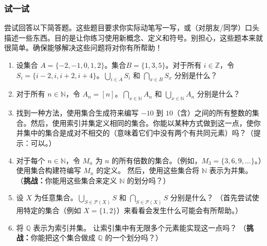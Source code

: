 \subsubsection*{试一试}

尝试回答以下简答题。这些题目要求你实际动笔写一写，或（对朋友/同学）口头描述一些东西。目的是让你练习使用新概念、定义和符号。别担心，这些题本来就很简单。确保能够解决这些问题将对你有所帮助！

\begin{enumerate}[label=(\arabic*)]
    \item 设集合 $A = \{-2, -1, 0, 1, 2\}$。集合$ B = \{1, 3, 5\}$。对于所有 $i \in \mathbb{Z}$，令 $S_i = \{i - 2, i, i + 2, i + 4\}$。$\displaystyle{\bigcup_{i \in A}S_i}$ 和 $\displaystyle{\bigcap_{x \in B}S_x}$ 分别是什么？
    \item 对于所有 $n \in \mathbb{N}$，令 $A_n = [n]$。$\displaystyle{\bigcap_{x \in \mathbb{N}}A_n}$ 和 $\displaystyle{\bigcup_{x \in \mathbb{N}}A_n}$ 分别是什么？
    \item 找到一种方法，使用集合生成符来编写 $-10$ 到 $10$（含）之间的所有整数的集合。然后，使用索引并集定义相同的集合。你能以某种方式做到这一点，使你并集中的集合是成对不相交的（意味着它们中没有两个有共同元素）吗？（提示：可以。）
    \item 对于每个 $n \in \mathbb{N}$，令 $M_n$ 为 $n$ 的所有倍数的集合。（例如，$M_3 = \{3, 6, 9,\dots\}$。）使用集合构建符编写 $M_n$ 的定义。 然后，使用这些集合将 $\mathbb{N}$ 表示为并集。
    （\textbf{挑战：}你能用这些集合来定义 $\mathbb{N}$ 的划分吗？）
    \item 设 $X$ 为任意集合。$\displaystyle{\bigcup_{S \in \mathcal{P}(X)}S}$ 和 $\displaystyle{\bigcap_{S \in \mathcal{P}(X)}S}$ 分别是什么？
    （首先尝试使用特定的集合（例如 $X = \{1, 2\}$）来看看会发生什么可能会有所帮助。）
    \item 将 $\mathbb{Q}$ 表示为索引并集。
    让索引集中有无限多个元素能实现这一点吗？
    （\textbf{挑战：}你能把这个集合做成 $\mathbb{Q}$ 的一个划分吗？）
\end{enumerate}
